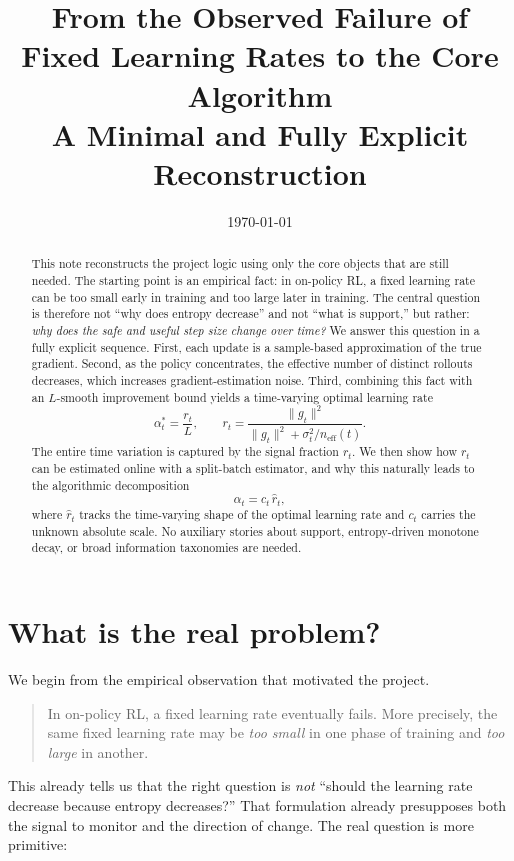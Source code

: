 \documentclass[11pt]{article}
\title{From the Observed Failure of Fixed Learning Rates to the Core Algorithm\\[0.4em]
\large A Minimal and Fully Explicit Reconstruction}
\author{}
\date{\today}
\begin{document}
\maketitle

\begin{abstract}
This note reconstructs the project logic using only the core objects that are still needed. The starting point is an empirical fact: in on-policy RL, a fixed learning rate can be too small early in training and too large later in training. The central question is therefore not ``why does entropy decrease'' and not ``what is support,'' but rather: \emph{why does the safe and useful step size change over time?} We answer this question in a fully explicit sequence. First, each update is a sample-based approximation of the true gradient. Second, as the policy concentrates, the effective number of distinct rollouts decreases, which increases gradient-estimation noise. Third, combining this fact with an $L$-smooth improvement bound yields a time-varying optimal learning rate
\[
\alpha_t^* = \frac{r_t}{L},
\qquad
r_t = \frac{\|g_t\|^2}{\|g_t\|^2 + \sigma_t^2 / n_{\mathrm{eff}}(t)}.
\]
The entire time variation is captured by the signal fraction $r_t$. We then show how $r_t$ can be estimated online with a split-batch estimator, and why this naturally leads to the algorithmic decomposition
\[
\alpha_t = c_t\,\hat r_t,
\]
where $\hat r_t$ tracks the time-varying shape of the optimal learning rate and $c_t$ carries the unknown absolute scale. No auxiliary stories about support, entropy-driven monotone decay, or broad information taxonomies are needed.
\end{abstract}

\section{What is the real problem?}

We begin from the empirical observation that motivated the project.

\begin{quote}
In on-policy RL, a fixed learning rate eventually fails. More precisely, the same fixed learning rate may be \emph{too small} in one phase of training and \emph{too large} in another.
\end{quote}

This already tells us that the right question is \emph{not} ``should the learning rate decrease because entropy decreases?'' That formulation already presupposes both the signal to monitor and the direction of change. The real question is more primitive:
\end{document}
